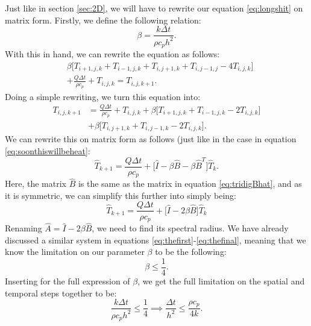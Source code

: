 \documentclass[reprint,english,notitlepage]{revtex4-1}  %
\begin{document}
Just like in section \ref{sec:2D}, we will have to rewrite our equation \ref{eq:longshit} on matrix form. Firstly, we define the following relation:
\begin{equation}
    \beta = \frac{k\Delta t}{\rho c_p h^2}.
\end{equation}
With this in hand, we can rewrite the equation as follows:
\begin{equation}
    \begin{split}
    &\beta\Big[T_{i+1,j,k} + T_{i-1,j,k} + T_{i,j+1,k} + T_{i,j-1,j} - 4T_{i,j,k}\Big]\\ &+ \frac{Q\Delta t}{\rho c_p} + T_{i,j,k} = T_{i,j,k+1}.
    \end{split}
\end{equation}
Doing a simple rewriting, we turn this equation into:
\begin{equation}
    \begin{split}
        T_{i,j,k+1} &= \frac{Q\Delta t}{\rho c_p} + T_{i,j,k} + \beta\Big[T_{i+1,j,k} + T_{i-1,j,k} - 2T_{i,j,k}\Big]\\ &+ \beta\Big[T_{i,j+1,k} + T_{i,j-1,k} - 2T_{i,j,k}\Big].
    \end{split}
\end{equation}
We can rewrite this on matrix form as follows (just like in the case in equation \ref{eq:soonthiswillbeheat}:
\begin{equation}
    \hat{T}_{k+1} = \frac{Q\Delta t}{\rho c_p} + \Big[\hat{I} - \beta\hat{B} - \beta\hat{B}^T\Big]\hat{T}_{k}.
\end{equation}
Here, the matrix $\hat{B}$ is the same as the matrix in equation \ref{eq:tridigBhat}, and as it is symmetric, we can simplify this further into simply being:
\begin{equation}
    \hat{T}_{k+1} = \frac{Q\Delta t}{\rho c_p} + \Big[\hat{I} - 2\beta\hat{B}\Big]\hat{T}_{k}
\end{equation}
Renaming $\hat{A} = \hat{I} - 2\beta\hat{B}$, we need to find its spectral radius. We have already discussed a similar system in equations \ref{eq:thefirst}-\ref{eq:thefinal}, meaning that we know the limitation on our parameter $\beta$ to be the following:
\begin{equation}
    \beta \leq \frac{1}{4}.
\end{equation}
Inserting for the full expression of $\beta$, we get the full limitation on the spatial and temporal steps together to be:
\begin{equation}\label{eq:limittooo}
    \frac{k\Delta t}{\rho c_p h^2} \leq \frac{1}{4} \implies \frac{\Delta t}{h^2} \leq \frac{\rho c_p}{4k}.
\end{equation}
\end{document}
